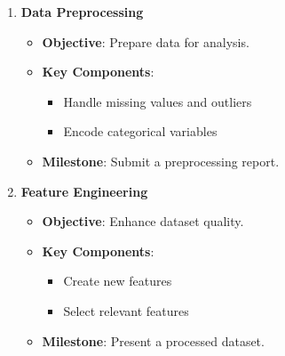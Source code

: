 \documentclass[aspectratio=169]{beamer}
\begin{document}
\begin{frame}[fragile]
\begin{enumerate}
    \item \textbf{Data Preprocessing}
      \begin{itemize}
        \item \textbf{Objective}: Prepare data for analysis.
        \item \textbf{Key Components}:
          \begin{itemize}
            \item Handle missing values and outliers
            \item Encode categorical variables
          \end{itemize}
        \item \textbf{Milestone}: Submit a preprocessing report.
      \end{itemize}

    \item \textbf{Feature Engineering}
      \begin{itemize}
        \item \textbf{Objective}: Enhance dataset quality.
        \item \textbf{Key Components}:
          \begin{itemize}
            \item Create new features
            \item Select relevant features
          \end{itemize}
        \item \textbf{Milestone}: Present a processed dataset.
      \end{itemize}
  \end{enumerate}
\end{frame}
\end{document}

